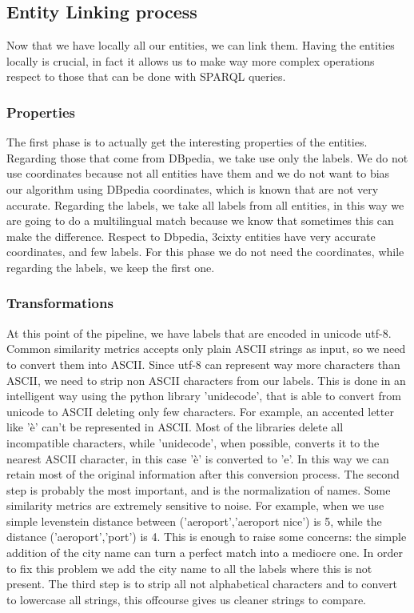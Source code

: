 \subsection{Entity Linking process}
Now that we have locally all our entities, we can link them. Having the entities locally is crucial, in fact it allows us to make way more complex operations respect to those that can be done with SPARQL queries.
\subsubsection{Properties}
The first phase is to actually get the interesting properties of the entities. Regarding those that come from DBpedia, we take use only the labels. We do not use coordinates because not all entities have them and we do not want to bias our algorithm using DBpedia coordinates, which is known that are not very accurate. Regarding the labels, we take all labels from all entities, in this way we are going to do a multilingual match because we know that sometimes this can make the difference.
Respect to Dbpedia, 3cixty entities have very accurate coordinates, and few labels. For this phase we do not need the coordinates, while regarding the labels, we keep the first one.
\subsubsection{Transformations}
At this point of the pipeline, we have labels that are encoded in unicode utf-8. Common similarity metrics accepts only plain ASCII strings as input, so we need to convert them into ASCII. Since utf-8 can represent way more characters than ASCII, we need to strip non ASCII characters from our labels. This is done in an intelligent way using the python library 'unidecode', that is able to convert from unicode to ASCII deleting only few characters. For example, an accented letter like 'è' can't be represented in ASCII. Most of the libraries delete all incompatible characters, while 'unidecode', when possible, converts it to the nearest ASCII character, in this case 'è' is converted to 'e'. In this way we can retain most of the original information after this conversion process.
The second step is probably the most important, and is the normalization of names. Some similarity metrics are extremely sensitive to noise. For example, when we use simple levenstein distance between ('aeroport','aeroport nice') is 5, while the distance ('aeroport','port') is 4. This is enough to raise some concerns: the simple addition of the city name can turn a perfect match into a mediocre one. In order to fix this problem we add the city name to all the labels where this is not present.
The third step is to strip all not alphabetical characters and to convert to lowercase all strings, this offcourse gives us cleaner strings to compare.

